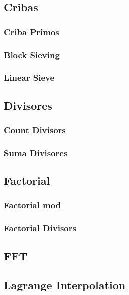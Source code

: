 \subsection{Cribas}
\subsubsection{Criba Primos}
\subsubsection{Block Sieving}
\subsubsection{Linear Sieve}

\subsection{Divisores}
\subsubsection{Count Divisors}
\subsubsection{Suma Divisores}

\subsection{Factorial}
\subsubsection{Factorial mod}
\subsubsection{Factorial Divisors}

\subsection{FFT}
\subsection{Lagrange Interpolation}


